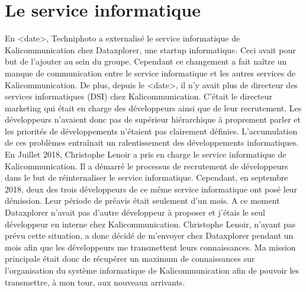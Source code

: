 \section{Le service informatique}
En <date>, Techniphoto a externalisé le service informatique de Kalicommunication chez Dataxplorer, une startup informatique. Ceci avait pour but de l'ajouter au sein du groupe. Cependant ce changement a fait naître un manque de communication entre le service informatique et les autres services de Kalicommunication.\newline
De plus, depuis le <date>, il n'y avait plus de directeur des services informatiques (DSI) chez Kalicommunication. C'était le directeur marketing qui était en charge des développeurs ainsi que de leur recrutement. Les développeurs n'avaient donc pas de supérieur hiérarchique à proprement parler et les priorités de développements n'étaient pas clairement définies. L'accumulation de ces problèmes entraînait un ralentissement des développements informatiques.\newline
En Juillet 2018, Christophe Lenoir a pris en charge le service informatique de Kalicommunication. Il a démarré le processus de recrutement de développeurs dans le but de réinternaliser le service informatique.\newline
Cependant, en septembre 2018, deux des trois développeurs de ce même service informatique ont posé leur démission. Leur période de préavis était seulement d'un mois. A ce moment Dataxplorer n'avait pas d'autre développeur à proposer et j'étais le seul développeur en interne chez Kalicommunication. Christophe Lenoir, n'ayant pas prévu cette situation, a donc décidé de m'envoyer chez Dataxplorer pendant un mois afin que les développeurs me transmettent leurs connaissances.\newline
Ma mission principale était donc de récupérer un maximum de connaissances sur l'organisation du système informatique de Kalicommunication afin de pouvoir les transmettre, à mon tour, aux nouveaux arrivants.
